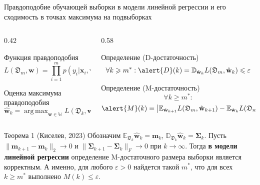 \documentclass[aspectratio=169]{beamer}
\DeclareMathOperator*{\argmax}{arg\,max}
\begin{document}
\begin{frame}{Правдоподобие обучающей выборки в модели линейной регрессии и его сходимость в точках максимума на подвыборках}
    \vspace{-0.5em}
    \begin{columns}[T]
        \begin{column}{0.42\textwidth}
            \begin{block}{Функция правдоподобия}
                \vspace{-0.3cm}
                \[ L(\mathfrak{D}_m, \mathbf{w}) = \prod_{i=1}^{m} p(y_i | \mathbf{x}_i, \mathbf{w}) \]
                \vspace{-0.5cm}
            \end{block}
            \begin{block}{Оценка максимума правдоподобия}
                \vspace{-0.2cm}
                \[ \hat{\mathbf{w}}_{k} = \argmax_{\mathbf{w} \in \mathbb{W}} L(\mathfrak{D}_k, \mathbf{w}) \]
                \vspace{-0.5cm}
            \end{block}
        \end{column}
        \begin{column}{0.58\textwidth}
            \begin{block}{Определение (\alert{D}-достаточность)}
                \vspace{-0.1cm}
                \[ \forall k \geqslant m^*: \alert{D}(k) = \mathbb{D}_{\hat{\mathbf{w}}_{k}} L(\mathfrak{D}_m, \hat{\mathbf{w}}_{k}) \leqslant \varepsilon \]
            \end{block}
            \vspace{-0.32em}
            \begin{block}{Определение (\alert{M}-достаточность)}
                \vspace{-0.3cm}
                \[ \forall k \geqslant m^*: \]
                \[ \alert{M}(k) = \left| \mathbb{E}_{\hat{\mathbf{w}}_{k+1}} L(\mathfrak{D}_m, \hat{\mathbf{w}}_{k+1}) - \mathbb{E}_{\hat{\mathbf{w}}_{k}} L(\mathfrak{D}_m, \hat{\mathbf{w}}_{k}) \right| \leqslant \varepsilon \]
            \end{block}
        \end{column}
    \end{columns}
    \vspace{-0.5em}
    \begin{block}{Теорема 1 (Киселев, 2023)}
        Обозначим $\mathbb{E}_{\mathfrak{D}_k} \hat{\mathbf{w}}_k = \mathbf{m}_k$, $\mathbb{D}_{\mathfrak{D}_k} \hat{\mathbf{w}}_k = \boldsymbol{\Sigma}_k$. Пусть $\| \mathbf{m}_{k+1} - \mathbf{m}_k \|_2 \to 0$ и $\| \boldsymbol{\Sigma}_{k+1} - \boldsymbol{\Sigma}_k \|_{F} \to 0$ при $k \to \infty$. Тогда \alert{\textbf{в модели линейной регрессии}} определение M-достаточного размера выборки является корректным. А именно, для любого $\varepsilon > 0$ найдется такой $m^*$, что для всех $k \geqslant m^*$ выполнено $M(k) \leqslant \varepsilon$.
    \end{block}
\end{frame}
\end{document}
